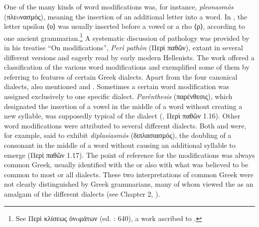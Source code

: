 One of the many kinds of word modifications was, for instance, \textit{pleonasmós} (πλεoνασμός), meaning the insertion of an additional letter into a word. In , the letter upsilon ⟨υ⟩ was usually inserted before a vowel or a rho ⟨ρ⟩, according to one ancient grammarian.\footnote{{See Περὶ κλίσεως ὀνoμάτων (ed. \citealt{Lentz1870}: 640), a work ascribed to .}} A systematic discussion of pathology was provided by  in his treatise “On modifications”, \textit{Perì pathôn} (Περὶ παθῶν), extant in several different versions and eagerly read by early modern Hellenists. The work offered a classification of the various word modifications and exemplified some of them by referring to features of certain Greek dialects. Apart from the four canonical dialects,  also mentioned  and . Sometimes a certain word modification was assigned exclusively to one specific dialect. \textit{Parénthesis} (παρένθεσις), which designated the insertion of a vowel in the middle of a word without creating a new syllable, was supposedly typical of the  dialect (, Περὶ παθῶν 1.16). Other word modifications were attributed to several different dialects. Both  and  were, for example, said to exhibit \textit{diplasiasmós} (διπλασιασμός), the doubling of a consonant in the middle of a word without causing an additional syllable to emerge (Περὶ παθῶν 1.17). The point of reference for the modifications was always common Greek, usually identified with the  or also with what was believed to be common to most or all dialects. These two interpretations of common Greek were not clearly distinguished by Greek grammarians, many of whom viewed the  as an amalgam of the different dialects (see Chapter 2, ).



